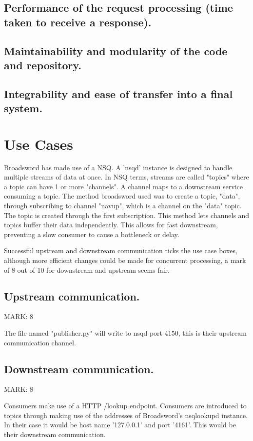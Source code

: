 \documentclass{article}
\begin{document}
\subsection{Performance of the request processing (time taken to receive a response).}

\subsection{Maintainability and modularity of the code and repository.}

\subsection{Integrability and ease of transfer into a final system.}


\section{Use Cases}

Broadsword has made use of a NSQ.
A 'nsqd' instance is designed to handle multiple streams of data at once.
In NSQ terms, streams are called "topics" where a topic can have 1 or more "channels".
A channel maps to a downstream service consuming a topic.
The method broadsword used was to create a topic, "data", through subscribing to channel "navup", which is a channel on the "data" topic. The topic is created through the first subscription.
This method lets channels and topics buffer their data independently. This allows for fast downstream, preventing a slow consumer to cause a bottleneck or delay.

Successful upstream and downstream communication ticks the use case boxes, although more efficient changes could be made for concurrent processing, a mark of 8 out of 10 for downstream and upstream seems fair.

\subsection{Upstream communication.}
\begin{flushleft}MARK: 8\end{flushleft}

The file named "publisher.py" will write to nsqd port 4150, this is their upstream communication channel.

\subsection{Downstream communication.}
\begin{flushleft}MARK: 8\end{flushleft}

Consumers make use of a HTTP /lookup endpoint. Consumers are introduced to topics through making use of the addresses of Broadsword's nsqlookupd instance. In their case it would be host name '127.0.0.1' and port '4161'. This would be their downstream communication.
\end{document}
